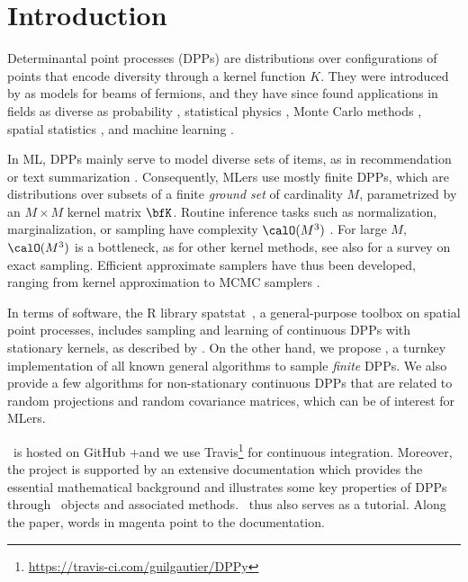 \section{Introduction} %
\label{sec:introduction}

Determinantal point processes (DPPs) are distributions over configurations of points that encode diversity through a kernel function $K$.
They were introduced by \citet{Mac75} as models for beams of fermions, and they have since found applications in fields as diverse as probability \citep{Sos00, Kon05, HKPV06}, statistical physics \citep{PaBe11}, Monte Carlo methods \citep{BaHa16}, spatial statistics \citep{LaMoRu15}, and machine learning \citep[ML,][]{KuTa12}.

In ML, DPPs mainly serve to model diverse sets of items, as in recommendation \citep{KaDeKo16, GaPaKo16} or text summarization \citep{DuBa18}.
Consequently, MLers  use mostly finite DPPs, which are distributions over subsets of a finite \emph{ground set} of cardinality $M$, parametrized by an $M\times M$ kernel matrix $\bfK$.
Routine inference tasks such as normalization, marginalization, or sampling have complexity $\calO(M^3)$ \citep{KuTa12}.
For large $M$, $\calO(M^3)$ is a bottleneck, as for other kernel methods, see also \citet{TrBaAm18} for a survey on exact sampling.
Efficient approximate samplers have thus been developed, ranging from kernel approximation \citep{AKFT13} to MCMC samplers \citep{AnGhRe16, LiJeSr16c, GaBaVa17}.

In terms of software, the R library \textsf{spatstat}\ \citep{BaTu05}, a general-purpose toolbox on spatial point processes, includes sampling and learning of continuous DPPs with stationary kernels, as described by \citet{LaMoRu15}.
On the other hand, we propose \DPPy, a turnkey implementation of all known general algorithms to sample \emph{finite} DPPs.
We also provide a few algorithms for non-stationary continuous DPPs that are related to random projections and random covariance matrices, which can be of interest for MLers.

\DPPy\ is hosted on GitHub\!
+and we use \setcounter{footnote}{5}Travis\footnote{\url{https://travis-ci.com/guilgautier/DPPy}} for continuous integration.
Moreover, the project is supported by an extensive documentation which provides the essential mathematical background and illustrates some key properties of DPPs through \DPPy\ objects and associated methods.
\DPPy\ thus also serves as a tutorial.
Along the paper, words in magenta point to the documentation.

